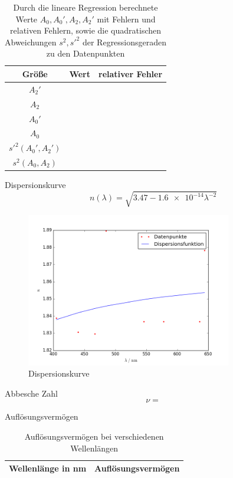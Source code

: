 \begin{table}[h!]
	\centering
	\begin{tabular}{c|c|c}
		Größe & Wert & relativer Fehler \\
		\hline
		$A_2'$ &  & 
		\\
		$A_2$ &  &  \\
		$A_0'$ &  & 
		\\
		$A_0$ &  &  \\
		\hline
		$s'^2(A_0',A_2')$ &  & \\
		$s^2(A_0,A_2)$ &  & \\
	\end{tabular}
	\caption{Durch die lineare Regression berechnete Werte $A_0,A_0',A_2,A_2'$ mit Fehlern und relativen Fehlern, sowie die quadratischen Abweichungen $s^2,s'^2$ der Regressionsgeraden zu den Datenpunkten}
\end{table}
Dispersionskurve
\[ n(\lambda) = \sqrt{3.47 - \SI{1.6e-14}\lambda^{-2}} \]
\begin{figure}[h!]
	\centering
	\includegraphics[width=0.8\textwidth]{Dispersionskurve.png}
	\caption{Dispersionskurve}
	\label{fig:DispKurve}
\end{figure}


Abbesche Zahl \[ \nu =  \]

Auflösungsvermögen
\begin{table}
	\centering
	\begin{tabular}{c|c}
		Wellenlänge in \si{\nano\meter} & Auflösungsvermögen \\
		\hline
		
	\end{tabular}
	\caption{Auflösungsvermögen bei verschiedenen Wellenlängen}
\end{table}

